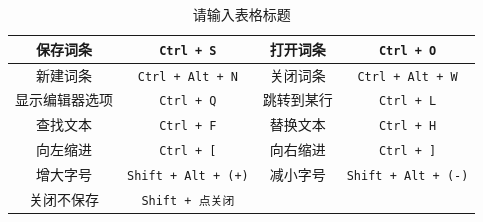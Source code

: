 \begin{table}[ht]
\centering
\caption{请输入表格标题}\label{editor_tab1}
\begin{tabular}{|c|c|c|c|}
\hline
保存词条 & \lstinline|Ctrl + S| & 打开词条 & \lstinline|Ctrl + O| \\
\hline
新建词条 & \lstinline|Ctrl + Alt + N| & 关闭词条 & \lstinline|Ctrl + Alt + W| \\
\hline
显示编辑器选项 & \lstinline|Ctrl + Q| & 跳转到某行 & \lstinline|Ctrl + L| \\
\hline
查找文本 & \lstinline|Ctrl + F| & 替换文本 & \lstinline|Ctrl + H| \\
\hline
向左缩进 & \lstinline|Ctrl + [| & 向右缩进 & \lstinline|Ctrl + ]| \\
\hline
增大字号 & \lstinline|Shift + Alt + (+)| & 减小字号 & \lstinline|Shift + Alt + (-)| \\
\hline
关闭不保存 & \lstinline|Shift + 点关闭| &  &  \\
\hline
\end{tabular}
\end{table}
